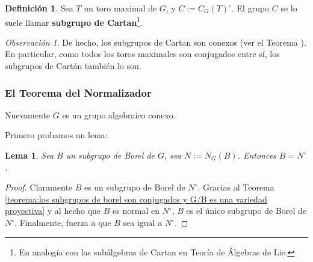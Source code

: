 \documentclass[spanish,10pt]{amsart}
\newtheorem{lemma}[theorem]{Lema}
\theoremstyle{definition}
\newtheorem{definition}[theorem]{Definición}
\theoremstyle{remark}
\newtheorem{remark}[theorem]{Observación}
\numberwithin{equation}{section}
\begin{document}
\begin{definition}
Sea $T$ un toro maximal de $G$, y $C := C_G (T)^\circ$. El grupo $C$ se lo suele llamar \textbf{subgrupo de Cartan}\footnote{En analogía con las subálgebras de Cartan en Teoría de Álgebras de Lie.}.
\end{definition}

\begin{remark}
De hecho, los subgrupos de Cartan son conexos (ver el Teorema \cite[\S 22.3]{humphreys2012linearAlgebraicGroups}). En particular, como todos los toros maximales son conjugados entre sí, los subgrupos de Cartán también lo son.
\end{remark}


\subsubsection{El Teorema del Normalizador}
Nuevamente $G$ es un grupo algebraico conexo.

Primero probamos un lema:

\begin{lemma}
Sea $B$ un subgrupo de Borel de $G$, sea $N:= N_G(B)$. Entonces $B = N^\circ$.
\end{lemma}
\begin{proof}
Claramente $B$ es un subgrupo de Borel de $N^\circ$. Gracias al Teorema \ref{teorema:los subgrupos de borel son conjugados y G/B es una variedad proyectiva} y al hecho que $B$ es normal en $N^\circ$, $B$ es el único subgrupo de Borel de $N^\circ$. Finalmente, \cite[Teorema de Densidad \S 22.2]{humphreys2012linearAlgebraicGroups} fuerza a que $B$ sea igual a $N^\circ$.
\end{proof}
\end{document}
